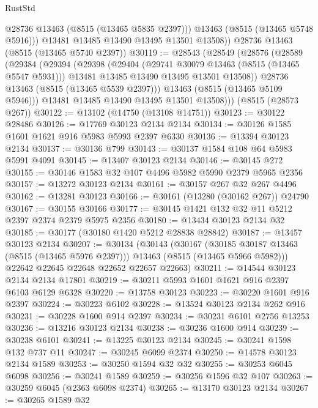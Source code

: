 \begin{lexlean}{RustStd}
\begin{coremodule}
            @28736
            @13463
            (@8515 (@13465 @5835 @2397)))
          @13463
          (@8515 (@13465 @5748 @5916)))
        @13481
        @13485
        @13490
        @13495
        @13501
        @13508))
    @28736
    @13463
    (@8515 (@13465 @5740 @2397))
@30119 := @28543
    (@28549
      (@28576
        (@28589
          (@29384
            (@29394
              (@29398
                (@29404
                  (@29741 @30079 @13463 (@8515 (@13465 @5547 @5931)))
                  @13481
                  @13485
                  @13490
                  @13495
                  @13501
                  @13508))
              @28736
              @13463
              (@8515 (@13465 @5539 @2397)))
            @13463
            (@8515 (@13465 @5109 @5946)))
          @13481
          @13485
          @13490
          @13495
          @13501
          @13508)))
    (@8515 (@28573 @267))
@30122 := @13102 (@14750 (@13108 @14751))
@30123 := @30122 @28486
@30126 := @17769 @30123 @2134 @2134
@30134 := @30126 @1585 @1601 @1621 @916 @5983 @5993 @2397 @6330
@30136 := @13394 @30123 @2134
@30137 := @30136 @799
@30143 := @30137 @1584 @108 @64 @5983 @5991 @4091
@30145 := @13407 @30123 @2134
@30146 := @30145 @272
@30155 := @30146 @1583 @32 @107 @4496 @5982 @5990 @2379 @5965 @2356
@30157 := @13272 @30123 @2134
@30161 := @30157 @267 @32 @267 @4496
@30162 := @13281 @30123
@30166 := @30161 (@13280 (@30162 @267)) @24790
@30167 := @30155 @30166
@30177 := @30145 @1421 @132 @32 @11 @5212 @2397 @2374 @2379 @5975 @2356
@30180 := @13434 @30123 @2134 @32
@30185 := @30177 (@30180 @1420 @5212 @28838 @28842)
@30187 := @13457 @30123 @2134
@30207 := @30134
    (@30143
      (@30167
        (@30185 @30187 @13463 (@8515 (@13465 @5976 @2397)))
        @13463
        (@8515 (@13465 @5966 @5982)))
      @22642
      @22645
      @22648
      @22652
      @22657
      @22663)
@30211 := @14544 @30123 @2134 @2134 @17801
@30219 := @30211 @5993 @1601 @1621 @916 @2397 @6103 @6129 @6328
@30220 := @13758 @30123
@30223 := @30220 @1601 @916 @2397
@30224 := @30223 @6102
@30228 := @13524 @30123 @2134 @262 @916
@30231 := @30228 @1600 @914 @2397
@30234 := @30231 @6101 @2756 @13253
@30236 := @13216 @30123 @2134
@30238 := @30236 @1600 @914
@30239 := @30238 @6101
@30241 := @13225 @30123 @2134
@30245 := @30241 @1598 @132 @737 @11
@30247 := @30245 @6099 @2374
@30250 := @14578 @30123 @2134 @1589
@30253 := @30250 @1594 @32 @32
@30255 := @30253 @6045 @6098
@30256 := @30241 @1589
@30259 := @30256 @1596 @32 @107
@30263 := @30259 @6045 (@2363 @6098 @2374)
@30265 := @13170 @30123 @2134
@30267 := @30265 @1589 @32

\end{coremodule}
\end{lexlean}
